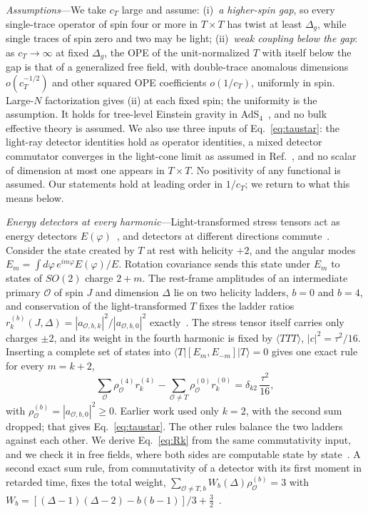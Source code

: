 \documentclass[aps,prl,twocolumn,superscriptaddress,nofootinbib,floatfix]{revtex4-2}
\begin{document}
\textit{Assumptions}---We take $c_T$ large and assume: (i)~\emph{a higher-spin gap}, so every single-trace operator of spin four or
more in $T\times T$ has twist at least $\Delta_g$, while single traces of spin zero and two may be light; (ii)~\emph{weak coupling below
the gap}: as $c_T\to\infty$ at fixed $\Delta_g$, the OPE of the unit-normalized $T$ with itself below the gap is that of a generalized
free field, with double-trace anomalous dimensions $o(c_T^{-1/2})$ and other squared OPE coefficients $o(1/c_T)$, uniformly in spin.
Large-$N$ factorization gives (ii) at each fixed spin; the uniformity is the assumption. It holds for tree-level Einstein gravity in
AdS$_4$~\cite{SM}, and no bulk effective theory is assumed. We also use three inputs of Eq.~\eqref{eq:taustar}: the light-ray detector
identities hold as operator identities, a mixed detector commutator converges in the light-cone limit as assumed in
Ref.~\cite{KKSDZ}, and no scalar of dimension at most one appears in $T\times T$. No positivity of any functional is assumed. Our
statements hold at leading order in $1/c_T$; we return to what this means below.

\textit{Energy detectors at every harmonic}---Light-transformed stress tensors act as energy detectors
$E(\varphi)$~\cite{KSDlight,HofmanMaldacena}, and detectors at different directions commute~\cite{KKSDZ}. Consider the state created by
$T$ at rest with helicity $+2$, and the angular modes $E_m=\int d\varphi\,e^{im\varphi}E(\varphi)/E$. Rotation covariance sends this
state under $E_m$ to states of $SO(2)$ charge $2+m$. The rest-frame amplitudes of an intermediate primary $\mathcal O$ of spin $J$ and
dimension $\Delta$ lie on two helicity ladders, $b=0$ and $b=4$, and conservation of the light-transformed $T$ fixes the ladder ratios
$r_k^{(b)}(J,\Delta)=|a_{\mathcal O,b,k}|^2/|a_{\mathcal O,b,0}|^2$ exactly~\cite{SM}. The stress tensor itself carries only charges $\pm2$,
and its weight in the fourth harmonic is fixed by $\langle TTT\rangle$, $|c|^2=\tau^2/16$. Inserting a complete set of states into
$\langle T|[E_m,E_{-m}]|T\rangle=0$ gives one exact rule for every $m=k+2$,
\begin{equation}
\sum_{\mathcal O}\rho^{(4)}_{\mathcal O}r_k^{(4)}-\sum_{\mathcal O\neq T}\rho^{(0)}_{\mathcal O}r_k^{(0)}=\delta_{k2}\,\frac{\tau^2}{16},
\label{eq:Rk}
\end{equation}
with $\rho^{(b)}_{\mathcal O}=|a_{\mathcal O,b,0}|^2\ge0$. Earlier work used only $k=2$, with the second sum dropped; that gives
Eq.~\eqref{eq:taustar}. The other rules balance the two ladders against each other. We derive Eq.~\eqref{eq:Rk} from the same
commutativity input, and we check it in free fields, where both sides are computable state by state~\cite{SM}. A second exact sum rule, from
commutativity of a detector with its first moment in retarded time, fixes the total weight,
$\sum_{\mathcal O\neq T,b}W_b(\Delta)\rho^{(b)}_{\mathcal O}=3$ with $W_b=[(\Delta-1)(\Delta-2)-b(b-1)]/3+\tfrac32$~\cite{SM}.
\end{document}
